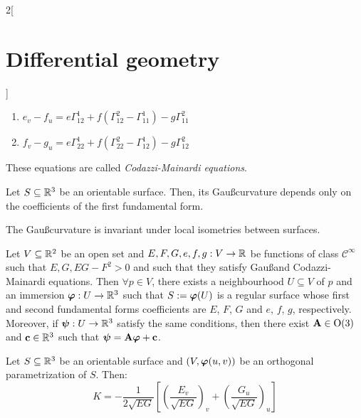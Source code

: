 \documentclass[../../../main_math.tex]{subfiles}
\begin{document}
\begin{multicols}{2}[\section{Differential geometry}]
\begin{proposition}
\begin{enumerate}
      \item $\displaystyle e_v-f_u=e\Gamma_{12}^1+f\left(\Gamma_{12}^2-\Gamma_{11}^1\right)-g\Gamma_{11}^2$
      \item $\displaystyle f_v-g_u=e\Gamma_{22}^1+f\left(\Gamma_{22}^2-\Gamma_{12}^1\right)-g\Gamma_{12}^2$
    \end{enumerate}
    These equations are called \emph{Codazzi-Mainardi equations}.
  \end{proposition}
  \begin{corollary}
    Let $S\subseteq\mathbb{R}^3$ be an orientable surface. Then, its Gau\ss\space curvature depends only on the coefficients of the first fundamental form.
  \end{corollary}
  \begin{theorem}
    The Gau\ss\space curvature is invariant under local isometries between surfaces.
  \end{theorem}
  \begin{theorem}
    Let $V\subseteq\mathbb{R}^2$ be an open set and $E,F,G,e,f,g:V\rightarrow\mathbb{R}$ be functions of class $\mathcal{C}^\infty$ such that $E,G,EG-F^2>0$ and such that they satisfy Gau\ss\space and Codazzi-Mainardi equations. Then $\forall p\in V$, there exists a neighbourhood $U\subseteq V$ of $p$ and an immersion $\boldsymbol{\mathrm{\varphi}}:U\rightarrow\mathbb{R}^3$ such that $S:=\boldsymbol{\mathrm{\varphi}}(U)$ is a regular surface whose first and second fundamental forms coefficients are $E$, $F$, $G$ and $e$, $f$, $g$, respectively. Moreover, if $\boldsymbol{\mathrm{\psi}}:U\rightarrow\mathbb{R}^3$ satisfy the same conditions, then there exist $\boldsymbol{\mathrm{A}}\in\text{O}(3)$ and $\boldsymbol{\mathrm{c}}\in\mathbb{R}^3$ such that $\boldsymbol{\mathrm{\psi}}=\boldsymbol{\mathrm{A\varphi}}+\boldsymbol{\mathrm{c}}$.
  \end{theorem}
  \begin{proposition}
    Let $S\subseteq\mathbb{R}^3$ be an orientable surface and $(V,\boldsymbol{\mathrm{\varphi}}(u,v))$ be an orthogonal parametrization of $S$. Then: $$K=-\frac{1}{2\sqrt{EG}}\left[{\left(\frac{E_v}{\sqrt{EG}}\right)}_v+{\left(\frac{G_u}{\sqrt{EG}}\right)}_u\right]$$
  \end{proposition}

\end{multicols}
\end{document}
